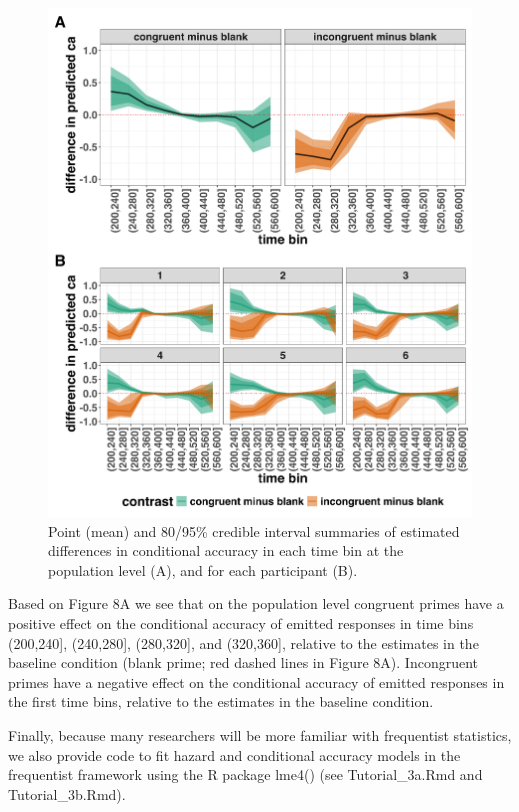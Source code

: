 \documentclass[
  man, donotrepeattitle,floatsintext]{apa6}
\begin{document}
\begin{figure}[H]

{\centering \includegraphics[width=0.8\linewidth,height=0.67\textheight,]{../Tutorial_2_Bayesian/figures/M1i_ca_ame_combined} 

}

\caption{Point (mean) and 80/95\% credible interval summaries of estimated differences in conditional accuracy in each time bin at the population level (A), and for each participant (B).}\label{fig:plot-ca-grand-ame-effects}
\end{figure}

Based on Figure 8A we see that on the population level congruent primes have a positive effect on the conditional accuracy of emitted responses in time bins (200,240{]}, (240,280{]}, (280,320{]}, and (320,360{]}, relative to the estimates in the baseline condition (blank prime; red dashed lines in Figure 8A).
Incongruent primes have a negative effect on the conditional accuracy of emitted responses in the first time bins, relative to the estimates in the baseline condition.

Finally, because many researchers will be more familiar with frequentist statistics, we also provide code to fit hazard and conditional accuracy models in the frequentist framework using the R package lme4() (see Tutorial\_3a.Rmd and Tutorial\_3b.Rmd).
\end{document}
